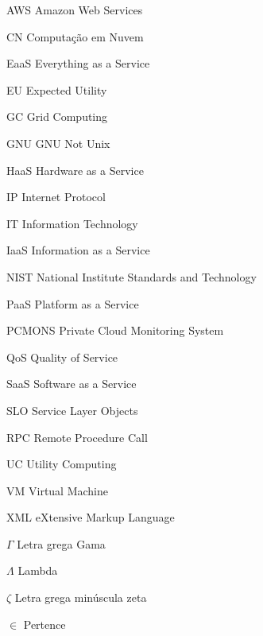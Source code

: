 \documentclass[12pt,openright,twoside,a4paper,english,brazil]{abntex2}
\begin{document}
\begin{siglas}
  \item[AWS] Amazon Web Services
  \item[CN] Computação em Nuvem
  \item[EaaS] Everything as a Service
  \item[EU] Expected Utility
  \item[GC] Grid Computing
  \item[GNU] GNU Not Unix
  \item[HaaS] Hardware as a Service
  \item[IP] Internet Protocol
  \item[IT] Information Technology
  \item[IaaS] Information as a Service
  \item[NIST] National Institute Standards and Technology
  \item[PaaS] Platform as a Service
  \item[PCMONS] Private Cloud Monitoring System
  \item[QoS] Quality of Service
  \item[SaaS] Software as a Service 
  \item[SLO] Service Layer Objects
  \item[RPC] Remote Procedure Call
  \item[UC] Utility Computing
  \item[VM] Virtual Machine
  \item[XML] eXtensive Markup Language  
\end{siglas}


\begin{simbolos}
  \item[$ \Gamma $] Letra grega Gama
  \item[$ \Lambda $] Lambda
  \item[$ \zeta $] Letra grega minúscula zeta
  \item[$ \in $] Pertence
\end{simbolos}


\end{document}
